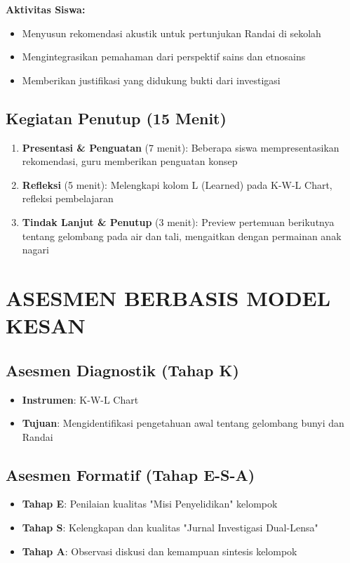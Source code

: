 \documentclass[12pt,a4paper]{article}
\begin{document}
\textbf{Aktivitas Siswa:}
\begin{itemize}
\item Menyusun rekomendasi akustik untuk pertunjukan Randai di sekolah
\item Mengintegrasikan pemahaman dari perspektif sains dan etnosains
\item Memberikan justifikasi yang didukung bukti dari investigasi
\end{itemize}

\subsection{Kegiatan Penutup (15 Menit)}

\begin{enumerate}
\item \textbf{Presentasi \& Penguatan} (7 menit): Beberapa siswa mempresentasikan rekomendasi, guru memberikan penguatan konsep
\item \textbf{Refleksi} (5 menit): Melengkapi kolom L (Learned) pada K-W-L Chart, refleksi pembelajaran
\item \textbf{Tindak Lanjut \& Penutup} (3 menit): Preview pertemuan berikutnya tentang gelombang pada air dan tali, mengaitkan dengan permainan anak nagari
\end{enumerate}

\section{ASESMEN BERBASIS MODEL KESAN}

\subsection{Asesmen Diagnostik (Tahap K)}
\begin{itemize}
\item \textbf{Instrumen}: K-W-L Chart
\item \textbf{Tujuan}: Mengidentifikasi pengetahuan awal tentang gelombang bunyi dan Randai
\end{itemize}

\subsection{Asesmen Formatif (Tahap E-S-A)}
\begin{itemize}
\item \textbf{Tahap E}: Penilaian kualitas "Misi Penyelidikan" kelompok
\item \textbf{Tahap S}: Kelengkapan dan kualitas "Jurnal Investigasi Dual-Lensa"
\item \textbf{Tahap A}: Observasi diskusi dan kemampuan sintesis kelompok
\end{itemize}
\end{document}
